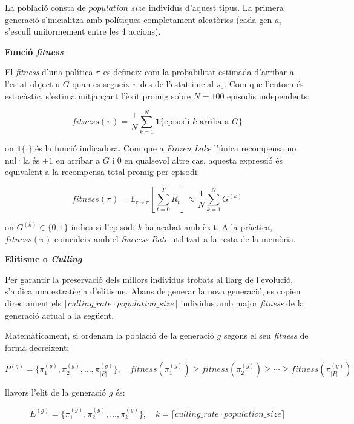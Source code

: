 \documentclass[12pt,a4paper]{report}
\begin{document}
La població consta de $\mathit{population\_size}$ individus d'aquest tipus. La primera generació s'inicialitza amb polítiques completament aleatòries (cada gen $a_i$ s'escull uniformement entre les 4 accions).

\textbf{Funció \textit{fitness}}

El \textit{fitness} d'una política $\pi$ es defineix com la probabilitat estimada d'arribar a l'estat objectiu
$G$ quan es segueix $\pi$ des de l'estat inicial $s_0$. Com que l'entorn és estocàstic, s'estima mitjançant
l'èxit promig sobre $N = 100$ episodis independents:

\[
  \mathit{fitness}(\pi) = \frac{1}{N} \sum_{k=1}^{N} \mathbf{1}\{ \text{episodi } k \text{ arriba a } G \}
\]

on $\mathbf{1}\{\cdot\}$ és la funció indicadora.  
Com que a \textit{Frozen Lake} l'única recompensa no nul·la és $+1$ en arribar a $G$ i $0$ en qualsevol altre cas,
aquesta expressió és equivalent a la recompensa total promig per episodi:

\[
  \mathit{fitness}(\pi) = \mathbb{E}_{\tau \sim \pi} \left[ \sum_{t=0}^{T} R_t \right] \approx \frac{1}{N} \sum_{k=1}^{N} G^{(k)}
\]

on $G^{(k)} \in \{0,1\}$ indica si l'episodi $k$ ha acabat amb èxit.  
A la pràctica, $\mathit{fitness}(\pi)$ coincideix amb el \textit{Success Rate} utilitzat a la resta de la memòria.

\textbf{Elitisme o \textit{Culling}}

Per garantir la preservació dels millors individus trobats al llarg de l'evolució, s'aplica una estratègia
d'elitisme. Abans de generar la nova generació, es copien directament els
$\lceil \mathit{culling\_rate} \cdot \mathit{population\_size} \rceil$ individus amb major \textit{fitness} de
la generació actual a la següent.

Matemàticament, si ordenam la població de la generació $g$ segons el seu \textit{fitness} de forma decreixent:

\[
P^{(g)} = \bigl\{ \pi^{(g)}_1, \pi^{(g)}_2, \dots, \pi^{(g)}_{|P|} \bigr\}, \quad 
\mathit{fitness}(\pi^{(g)}_1) \geq \mathit{fitness}(\pi^{(g)}_2) \geq \cdots \geq \mathit{fitness}(\pi^{(g)}_{|P|})
\]

llavors l'elit de la generació $g$ és:

\[
E^{(g)} = \bigl\{ \pi^{(g)}_1, \pi^{(g)}_2, \dots, \pi^{(g)}_{k} \bigr\}, \quad 
k = \lceil \mathit{culling\_rate} \cdot \mathit{population\_size} \rceil
\]
\end{document}
